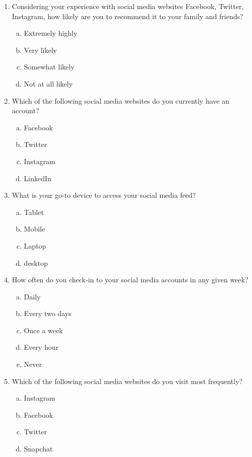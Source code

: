 \begin{enumerate}[1)]
\item Considering your experience with social media websites Facebook, Twitter, Instagram, how likely are you to recommend it to your family and friends?

	\begin{enumerate}[a)]
	\item Extremely highly 
	\item Very likely	
	\item Somewhat likely 	
	\item Not at all likely 
	\end{enumerate}
	
\item Which of the following social media websites do you currently have an account?
	\begin{enumerate}[a)]
	\item Facebook
	\item Twitter
	\item Instagram
	\item LinkedIn
	\end{enumerate}

\item What is your go-to device to access your social media feed?

	\begin{enumerate}[a)]
	\item Tablet
	\item Mobile 
	\item Laptop
	\item desktop
	\end{enumerate}

\item How often do you check-in to your social media accounts in any given week?

	\begin{enumerate}[a)]
	\item Daily 
	\item Every two days
	\item Once a week 
	\item Every hour 
	\item Never 
	\end{enumerate}

\item Which of the following social media websites do you visit most frequently?

	\begin{enumerate}[a)]
	\item Instagram
	\item Facebook
	\item Twitter
	\item Snapchat
	\end{enumerate}


\end{enumerate}

